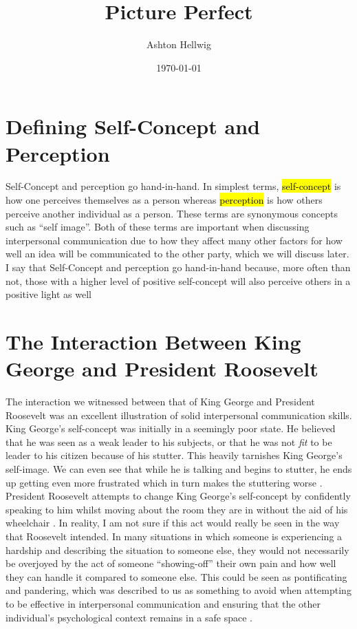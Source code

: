 \documentclass[stu,12pt]{apa7}
\title{%
    Picture Perfect
  }
\author{Ashton Hellwig}
\date{\today}
\begin{document}
  \maketitle

  \section{Defining Self-Concept and Perception}
    Self-Concept and perception go hand-in-hand. In simplest terms,
      \hl{self-concept} is how one perceives themselves as a person whereas
      \hl{perception} is how others perceive another individual as a person.
      These terms are synonymous concepts such as ``self image''. Both of these
      terms are important when discussing interpersonal communication due to
      how they affect many other factors for how well an idea will be
      communicated to the other party, which we will discuss later.
      I say that Self-Concept and perception go hand-in-hand because, more
      often than not, those with a higher level of positive self-concept will
      also perceive others in a positive light as well
      \parencite{markus_role_1985}


  \section{The Interaction Between King George and President Roosevelt}
    The interaction we witnessed between that of King George and President
      Roosevelt was an excellent illustration of solid interpersonal
      communication skills. King George's self-concept was initially in a
      seemingly poor state. He believed that he was seen as a weak leader
      to his subjects, or that he was not \textit{fit} to be leader to his
      citizen because of his stutter. This heavily tarnishes King George's
      self-image. We can even see that while he is talking and begins to
      stutter, he ends up getting even more frustrated which in turn makes the
      stuttering worse \parencite{michell_hyde_2012}. President Roosevelt
      attempts to change King George's self-concept by confidently speaking to
      him whilst moving about the room they are in without the aid of his
      wheelchair \parencite{michell_hyde_2012}. In reality, I am not sure if
      this act would really be seen in the way that Roosevelt intended. In many
      situations in which someone is experiencing a hardship and describing the
      situation to someone else, they would not necessarily be overjoyed by the
      act of someone ``showing-off'' their own pain and how well they can handle
      it compared to someone else. This could be seen as pontificating and
      pandering, which was described to us as something to avoid when attempting
      to be effective in interpersonal communication and ensuring that the
      other individual's psychological context remains in a safe space
      \parencite{headlee_10_2015}.
\end{document}
